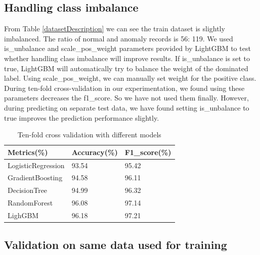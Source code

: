 \documentclass[14pt, conference]{IEEEtran}
\begin{document}
\subsection{Handling class imbalance}
From Table \ref{datasetDescription} we can see the train dataset is slightly imbalanced. The ratio of normal and anomaly records is 56: 119.  We used is\_unbalance and scale\_pos\_weight  parameters provided by LightGBM to test whether handling class imbalance will improve results. If is\_unbalance is set to true, LightGBM will automatically try to balance the weight of the dominated label. Using scale\_pos\_weight, we can manually set weight for the positive class. %
During ten-fold cross-validation in our experimentation, we found using these parameters decreases the f1\_score. So we have not used them finally. However, during predicting on separate test data, we have found setting is\_unbalance to true improves the prediction performance slightly.

\begin{table}
\normalsize
\centering
\caption{Ten-fold cross validation with different models}
\label{crossvalidationWithDifferentModels}
\renewcommand{\arraystretch}{1.2}

\begin{tabular}{|C{2.8cm}|C{2.1cm}|C{2.1cm}|}
\hline
\textbf{Metrics(\%)} & \textbf{Accuracy(\%)} & \textbf{F1\_score(\%)} \\ \hline
LogisticRegression & 93.54 & 95.42 \\ \hline
GradientBoosting & 94.58 & 96.11\\ \hline
DecisionTree  & 94.99 & 96.32\\ \hline
RandomForest  & 96.08 & 97.14 \\ \hline
LighGBM & 96.18 & 97.21 \\ \hline
\end{tabular}
\end{table}


\subsection{Validation on same data used for training}
\label{sec:validationOnSame}
\end{document}
